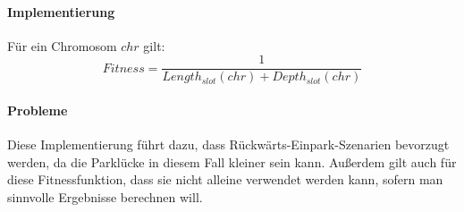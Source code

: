 \documentclass[12pt,a4paper]{scrartcl}
\begin{document}
\begin{enumerate}
	\paragraph{Implementierung}
	Für ein Chromosom $chr$ gilt:
	\begin{equation}
		Fitness = \frac{1}{Length_{slot}(chr) + Depth_{slot}(chr)}
	\end{equation}
	\paragraph{Probleme} Diese Implementierung führt dazu, dass Rückwärts-Einpark-Szenarien bevorzugt werden, da die Parklücke in diesem Fall kleiner sein kann. Außerdem gilt auch für diese Fitnessfunktion, dass sie nicht alleine verwendet werden kann, sofern man sinnvolle Ergebnisse berechnen will.
\end{enumerate}
\end{document}
